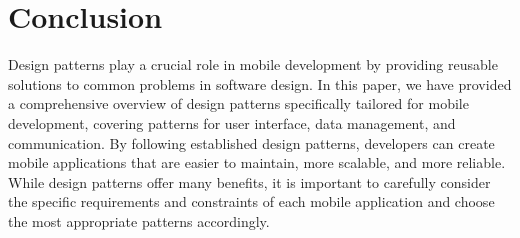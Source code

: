 \documentclass[journal]{IEEEtran}
\begin{document}
	\section{Conclusion}
	Design patterns play a crucial role in mobile development by providing reusable solutions to common problems in software design. In this paper, we have provided a comprehensive overview of design patterns specifically tailored for mobile development, covering patterns for user interface, data management, and communication. By following established design patterns, developers can create mobile applications that are easier to maintain, more scalable, and more reliable. While design patterns offer many benefits, it is important to carefully consider the specific requirements and constraints of each mobile application and choose the most appropriate patterns accordingly.
	
	
	
\end{document}
